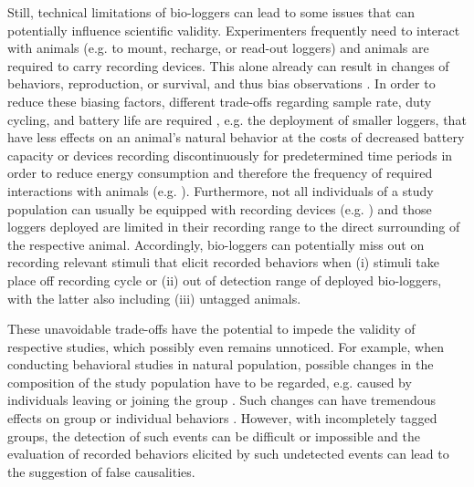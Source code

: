 \documentclass[11pt,pdftex]{article}
\begin{document}
Still, technical limitations of bio-loggers can lead to some issues that can potentially influence scientific validity. Experimenters frequently need to interact with animals (e.g. to mount, recharge, or read-out loggers) and animals are required to carry recording devices. This alone already can result in changes of behaviors, reproduction, or survival, and thus bias observations \citep{Saraux2011}. In order to reduce these biasing factors, different trade-offs regarding sample rate, duty cycling, and battery life are required \citep{Hughey2018}, e.g. the deployment of smaller loggers, that have less effects on an animal's natural behavior at the costs of decreased battery capacity or devices recording discontinuously for predetermined time periods in order to reduce energy consumption and therefore the frequency of required interactions with animals (e.g. \citealp{StrandburgPeshkin2017}). Furthermore, not all individuals of a study population can usually be equipped with recording devices (e.g. \citealp{StrandburgPeshkin2019}) and those loggers deployed are limited in their recording range to the direct surrounding of the respective animal. Accordingly, bio-loggers can potentially miss out on recording relevant stimuli that elicit recorded behaviors when (i) stimuli take place off recording cycle or (ii) out of detection range of deployed bio-loggers, with the latter also including (iii) untagged animals. 

These unavoidable trade-offs have the potential to impede the validity of respective studies, which possibly even remains unnoticed. For example, when conducting behavioral studies in natural population, possible changes in the composition of the study population have to be regarded, e.g. caused by individuals leaving or joining the group \citep{Janson1985, Engh2002}. Such changes can have tremendous effects on group or individual behaviors \citep{Metcalfe1995, Sapolsky2005}. However, with incompletely tagged groups, the detection of such events can be difficult or impossible and the evaluation of recorded behaviors elicited by such undetected events can lead to the suggestion of false causalities.
\end{document}
